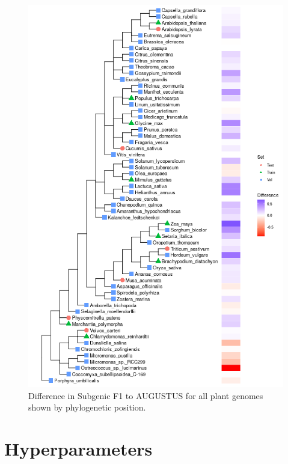 \documentclass{article}
\begin{document}
\begin{figure}[!h]
\renewcommand\thefigure{S4}
\centerline{\includegraphics[width=1.0\textwidth]{images/plants_differences}}
\caption{Difference in Subgenic F1 to AUGUSTUS for all plant genomes shown by phylogenetic position.}
\end{figure}


\clearpage
\section{Hyperparameters}
\end{document}
